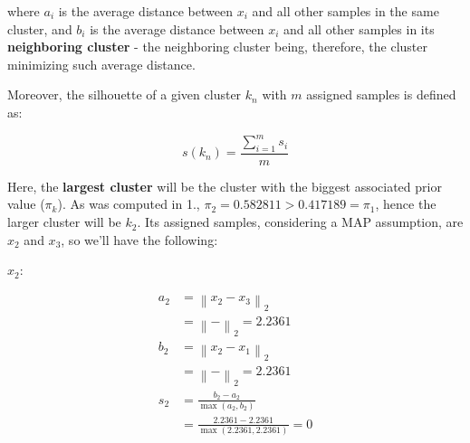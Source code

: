 \documentclass[12pt]{article}
\begin{document}
\begin{enumerate}[leftmargin=\labelsep]
\begin{enumerate}[leftmargin=\labelsep]
                where $a_i$ is the average distance between $x_i$ and all other samples
                in the same cluster, and $b_i$ is the average distance between $x_i$ and all
                other samples in its \textbf{neighboring cluster} - the neighboring
                cluster being, therefore, the cluster minimizing such average distance.

                Moreover, the silhouette of a given cluster $k_n$ with $m$ assigned samples is defined as:

                \begin{equation*}
                  s(k_n) = \frac{\sum_{i=1}^m s_i}{m}
                \end{equation*}

                Here, the \textbf{largest cluster} will be the cluster with the
                biggest associated prior value ($\pi_k$). As was computed in 1.,
                $\pi_2 = 0.582811 > 0.417189 = \pi_1$,
                hence the larger cluster will be $k_2$. Its assigned samples,
                considering a MAP assumption, are $x_2$ and $x_3$, so we'll have
                the following:

                \vspace*{0.5cm}

                \begin{paracol}{2}
                  \setlength{\columnseprule}{1pt}
                  \def\columnseprulecolor{\color{black}}
                  \centering

                  $x_2$:

                  \begin{equation*}
                    \begin{aligned}
                      a_2 & = \left\| x_2 - x_3 \right\|_2                                           \\
                          & = \left\|  -  \right\|_2
                      = 2.2361                                                                       \\
                      b_2 & = \left\| x_2 - x_1 \right\|_2                                           \\
                          & = \left\|  -  \right\|_2
                      = 2.2361                                                                       \\
                      s_2 & = \frac{b_2 - a_2}{\max(a_2, b_2)}                                       \\
                          & = \frac{2.2361 - 2.2361}{\max(2.2361, 2.2361)} = 0
                    \end{aligned}
                  \end{equation*}


\end{paracol}
\end{enumerate}
\end{enumerate}
\end{document}
